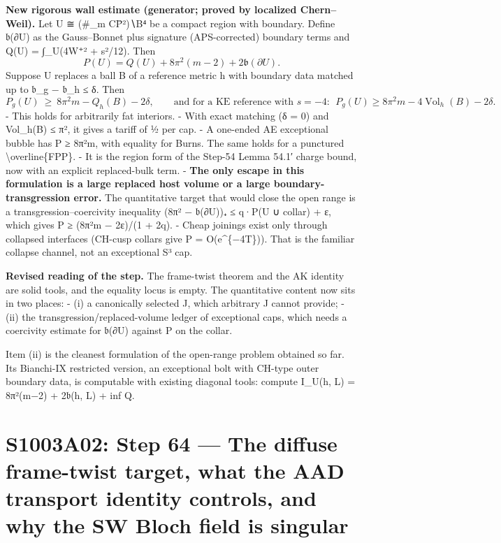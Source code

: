 \documentclass[
  10pt,
]{report}
\begin{document}
\textbf{New rigorous wall estimate (generator; proved by localized
Chern--Weil).} Let U ≅ (\#\_m CP̄²)∖B⁴ be a compact region with boundary.
Define 𝔟(∂U) as the Gauss--Bonnet plus signature (APS-corrected)
boundary terms and Q(U) = ∫\_U(4\textbar W⁺\textbar² + s²/12). Then \[
P(U)=Q(U)+8\pi^2(m-2)+2\mathfrak b(\partial U).
\] Suppose U replaces a ball B of a reference metric h with boundary
data matched up to \textbar 𝔟\_g − 𝔟\_h\textbar{} ≤ δ. Then \[
P_g(U)\ \ge\ 8\pi^2m-Q_h(B)-2\delta,\qquad
\text{and for a KE reference with } s=-4:\ \ P_g(U)\ge8\pi^2m-4\operatorname{Vol}_h(B)-2\delta .
\] - This holds for arbitrarily fat interiors. - With exact matching (δ
= 0) and Vol\_h(B) ≤ π², it gives a tariff of ½ per cap. - A one-ended
AE exceptional bubble has P ≥ 8π²m, with equality for Burns. The same
holds for a punctured \textbackslash overline\{FPP\}. - It is the region
form of the Step-54 Lemma 54.1′ charge bound, now with an explicit
replaced-bulk term. - \textbf{The only escape in this formulation is a
large replaced host volume or a large boundary-transgression error.} The
quantitative target that would close the open range is a
transgression--coercivity inequality (8π² − 𝔟(∂U))₊ ≤ q·P(U ∪ collar) +
ε, which gives P ≥ (8π²m − 2ε)/(1 + 2q). - Cheap joinings exist only
through collapsed interfaces (CH-cusp collars give P = O(e\^{}\{−4T\})).
That is the familiar collapse channel, not an exceptional S³ cap.

\textbf{Revised reading of the step.} The frame-twist theorem and the AK
identity are solid tools, and the equality locus is empty. The
quantitative content now sits in two places: - (i) a canonically
selected J, which arbitrary J cannot provide; - (ii) the
transgression/replaced-volume ledger of exceptional caps, which needs a
coercivity estimate for 𝔟(∂U) against P on the collar.

Item (ii) is the cleanest formulation of the open-range problem obtained
so far. Its Bianchi-IX restricted version, an exceptional bolt with
CH-type outer boundary data, is computable with existing diagonal tools:
compute I\_U(h, L) = 8π²(m−2) + 2𝔟(h, L) + inf Q.

\hypertarget{s1003a02-step-64-the-diffuse-frame-twist-target-what-the-aad-transport-identity-controls-and-why-the-sw-bloch-field-is-singular}{%
\chapter{S1003A02: Step 64 --- The diffuse frame-twist target, what the
AAD transport identity controls, and why the SW Bloch field is
singular}\label{s1003a02-step-64-the-diffuse-frame-twist-target-what-the-aad-transport-identity-controls-and-why-the-sw-bloch-field-is-singular}}
\end{document}
